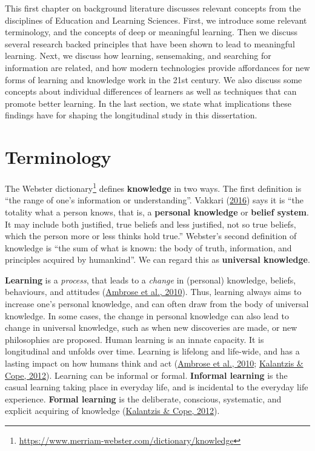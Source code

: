 \documentclass[letterpaper, nobind]{templates/ociamthesis}
\begin{document}
This first chapter on background literature discusses relevant concepts
from the disciplines of Education and Learning Sciences. First, we
introduce some relevant terminology, and the concepts of deep or
meaningful learning. Then we discuss several research backed principles
that have been shown to lead to meaningful learning. Next, we discuss
how learning, sensemaking, and searching for information are related,
and how modern technologies provide affordances for new forms of
learning and knowledge work in the 21st century. We also discuss some
concepts about individual differences of learners as well as techniques
that can promote better learning. In the last section, we state what
implications these findings have for shaping the longitudinal study in this
dissertation.

\hypertarget{sec-bg-learn-terminology}{%
\section{Terminology}\label{sec-bg-learn-terminology}}

The Webster dictionary\footnote{\url{https://www.merriam-webster.com/dictionary/knowledge}} defines \textbf{knowledge} in two ways. The first
definition is ``the range of one's information or understanding''.
Vakkari (\protect\hyperlink{ref-vakkari2016searching}{2016}) says it is ``the totality what a person knows,
that is, a \textbf{personal knowledge} or \textbf{belief system}. It may include
both justified, true beliefs and less justified, not so true beliefs,
which the person more or less thinks hold true.'' Webster's second
definition of knowledge is ``the sum of what is known: the body of truth,
information, and principles acquired by humankind''. We can regard this
as \textbf{universal knowledge}.

\textbf{Learning} is a \emph{process}, that leads to a \emph{change} in (personal)
knowledge, beliefs, behaviours, and attitudes (\protect\hyperlink{ref-ambrose2010howa}{Ambrose et al., 2010}). Thus,
learning always aims to increase one's personal knowledge, and can often
draw from the body of universal knowledge. In some cases, the change in
personal knowledge can also lead to change in universal knowledge, such
as when new discoveries are made, or new philosophies are proposed.
Human learning is an innate capacity. It is longitudinal and unfolds
over time. Learning is lifelong and life-wide, and has a lasting impact
on how humans think and act (\protect\hyperlink{ref-ambrose2010howa}{Ambrose et al., 2010}; \protect\hyperlink{ref-kalantzis2012newa}{Kalantzis \& Cope, 2012}).
Learning can be informal or formal. \textbf{Informal learning} is the casual
learning taking place in everyday life, and is incidental to the
everyday life experience. \textbf{Formal learning} is the deliberate,
conscious, systematic, and explicit acquiring of knowledge
(\protect\hyperlink{ref-kalantzis2012newa}{Kalantzis \& Cope, 2012}).
\end{document}
